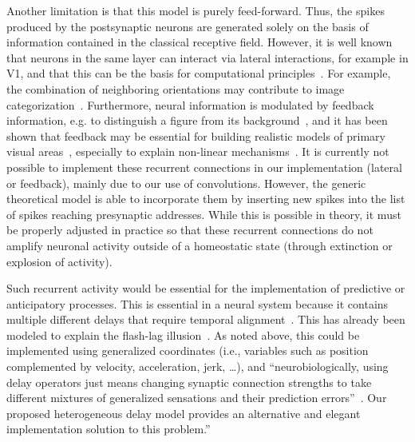 \documentclass[runningheads]{llncs}
\begin{document}
Another limitation is that this model is purely feed-forward. Thus, the spikes produced by the postsynaptic neurons are generated solely on the basis of information contained in the classical receptive field. However, it is well known that neurons in the same layer can interact via lateral interactions, for example in V1, and that this can be the basis for computational principles~\cite{chavane_revisiting_2022}. For example, the combination of neighboring orientations may contribute to image categorization~\cite{perrinet_edge_2015}. Furthermore, neural information is modulated by feedback information, e.g. to distinguish a figure from its background~\cite{roelfsema_early_2016}, and it has been shown that feedback may be essential for building realistic models of primary visual areas~\cite{boutin_sparse_2020,boutin_effect_2020}, especially to explain non-linear mechanisms~\cite{boutin_pooling_2022}. It is currently not possible to implement these recurrent connections in our implementation (lateral or feedback), mainly due to our use of convolutions. However, the generic theoretical model is able to incorporate them by inserting new spikes into the list of spikes reaching presynaptic addresses. While this is possible in theory, it must be properly adjusted in practice so that these recurrent connections do not amplify neuronal activity outside of a homeostatic state (through extinction or explosion of activity).  

Such recurrent activity would be essential for the implementation of predictive or anticipatory processes. This is essential in a neural system because it contains multiple different delays that require temporal alignment~\cite{hogendoorn_predictive_2019}. This has already been modeled to explain the flash-lag illusion~\cite{khoei_flash-lag_2017}. As noted above, this could be implemented using generalized coordinates (i.e., variables such as position complemented by velocity, acceleration, jerk, \ldots), and ``neurobiologically, using delay operators just means changing synaptic connection strengths to take different mixtures of generalized sensations and their prediction errors''~\cite{perrinet_active_2014}. Our proposed heterogeneous delay model provides an alternative and elegant implementation solution to this problem.''
%
\end{document}
